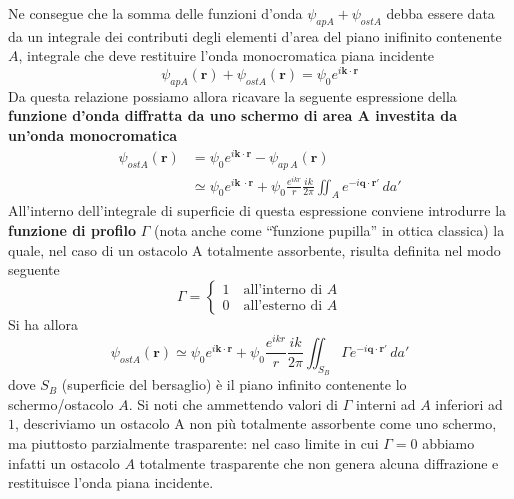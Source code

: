 Ne consegue che la somma delle funzioni d'onda $\psi_{ap A}+ \psi_{ost A}$ debba essere data da un integrale dei contributi degli elementi d'area del
piano inifinito contenente $A$, integrale che deve restituire l'onda monocromatica piana incidente
\[
	\psi_{ap A}(\bm{r})+ \psi_{ost A}(\bm{r}) = \psi_0 e^{i \bm{k} \cdot \bm{r}}
\]
Da questa relazione possiamo allora ricavare la seguente espressione della \textbf{funzione d'onda diffratta da uno schermo di area A investita da un'onda monocromatica}
\begin{align}
	    \psi_{ost A}(\bm{r}) & =  \psi_0 e^{i \bm{k} \cdot \bm{r}}- \psi_{ap \  A}(\bm{r}) \nonumber \\
		 & \simeq \psi_0 e^{i \bm{k} \
		\cdot \bm{r}} + \psi_0 \frac{e^{ikr}}{r} \frac{ik}{2 \pi} \iint_{A}e^{-i \bm{q} \cdot \bm{r'}} \, da'
		\label{eq:screen-scattered-wave}
\end{align}
All'interno dell'integrale di superficie di questa espressione conviene introdurre la \textbf{funzione di profilo}
$\Gamma$ (nota anche come ``f̀unzione pupilla'' in ottica classica) la quale, nel caso di un ostacolo A totalmente assorbente, risulta definita nel modo seguente
\[
	\Gamma =
	\begin{cases}
		1   \quad \text{all'interno di } A \\
		0  \quad \text{all'esterno di } A
	\end{cases}
\]
Si ha allora
\[
	\psi_{ost A}(\bm{r}) \simeq \psi_0e^{i \bm{k} \cdot \bm{r}} + \psi_0 \frac{e^{ikr}}{r} \frac{ik}{2 \pi} \iint_{S_B} \Gamma e^{-i \bm{q} \cdot \bm{r'}} \, da'
\]
dove $S_B$ (superficie del bersaglio) è il piano infinito contenente lo schermo/ostacolo $A$.
Si noti che ammettendo valori di $\Gamma$ interni ad $A$ inferiori ad $1$, descriviamo un ostacolo A non più totalmente
assorbente come uno schermo, ma piuttosto parzialmente trasparente: nel caso limite in cui $\Gamma = 0$ abbiamo infatti un ostacolo $A$ totalmente trasparente che non genera alcuna diffrazione e restituisce l'onda piana incidente.

